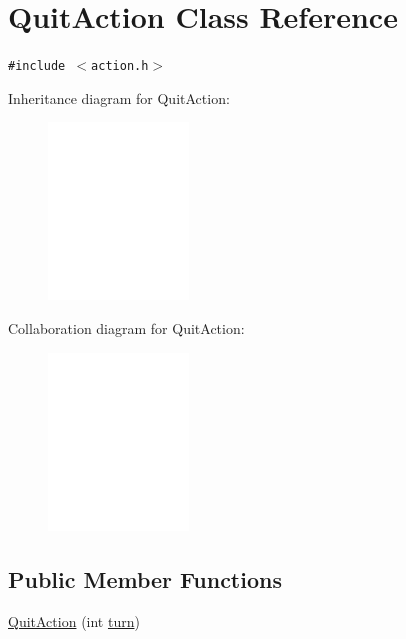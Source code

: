 \hypertarget{classQuitAction}{
\section{QuitAction Class Reference}
\label{classQuitAction}
}
{\tt \#include $<$action.h$>$}

Inheritance diagram for QuitAction:\nopagebreak
\begin{figure}[H]
\begin{center}
\leavevmode
\includegraphics[width=106pt]{classQuitAction__inherit__graph}
\end{center}
\end{figure}
Collaboration diagram for QuitAction:\nopagebreak
\begin{figure}[H]
\begin{center}
\leavevmode
\includegraphics[width=106pt]{classQuitAction__coll__graph}
\end{center}
\end{figure}
\subsection*{Public Member Functions}
\begin{CompactItemize}
\item 
\hyperlink{classQuitAction_2289ac1a77e824192de8fd60b36d17e8}{QuitAction} (int \hyperlink{classAction_51e5d56a6aa4a037e90df19587a225c7}{turn})
\end{CompactItemize}


